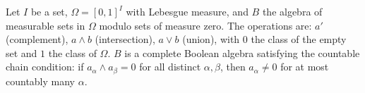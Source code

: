 Let $I$ be a set, $\Omega = [0,1]^I$ with Lebesgue measure, and $B$ the algebra of measurable sets in $\Omega$ modulo sets of measure zero. The operations are: $a'$ (complement), $a \wedge b$ (intersection), $a \vee b$ (union), with $0$ the class of the empty set and $1$ the class of $\Omega$. $B$ is a complete Boolean algebra satisfying the countable chain condition: if $a_\alpha \wedge a_\beta = 0$ for all distinct $\alpha, \beta$, then $a_\alpha \neq 0$ for at most countably many $\alpha$.

